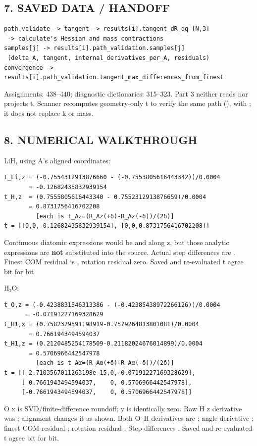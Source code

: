 \documentclass[10pt,a4paper]{article}
\begin{document}
\subsection{7. SAVED DATA / HANDOFF}
\begin{Verbatim}
path.validate -> tangent -> results[i].tangent_dR_dq [N,3]
 -> calculate's Hessian and mass contractions
samples[j] -> results[i].path_validation.samples[j]
 (delta_A, tangent, internal_derivatives_per_A, residuals)
convergence -> results[i].path_validation.tangent_max_differences_from_finest
\end{Verbatim}
Assignments: 438–440; diagnostic dictionaries: 315–323. Part 3 neither reads nor projects t. Scanner  recomputes geometry-only t to verify the same path (), with ; it does not replace k or mass.

\subsection{8. NUMERICAL WALKTHROUGH}
LiH, using A's aligned coordinates:

\begin{Verbatim}
t_Li,z = (-0.7554312913876660 - (-0.7553805616443342))/0.0004
       = -0.12682435832939154
t_H,z  = (0.7555805616443340 - 0.7552312913876659)/0.0004
       = 0.8731756416702208
         [each is t_Az=(R_Az(+δ)-R_Az(-δ))/(2δ)]
t = [[0,0,-0.12682435832939154], [0,0,0.8731756416702208]]
\end{Verbatim}
Continuous diatomic expressions would be  and  along z, but those analytic expressions are \textbf{not} substituted into the source. Actual step differences are \code{[4.440892098500626e-13,6.661338147750939e-13,0]}. Finest COM residual is , rotation residual zero. Saved and re-evaluated t agree bit for bit.

H₂O:

\begin{Verbatim}
t_O,z = (-0.4238831546313386 - (-0.42385438972266126))/0.0004
      = -0.07191227169328629
t_H1,x = (0.7582329591198919-0.7579264813801081)/0.0004
       = 0.7661943494594037
t_H1,z = (0.2120485254178509-0.21182024676014899)/0.0004
       = 0.5706966442547978
         [each is t_Aα=(R_Aα(+δ)-R_Aα(-δ))/(2δ)]
t = [[-2.7103567011263198e-15,0,-0.07191227169328629],
     [ 0.7661943494594037,    0, 0.5706966442547978],
     [-0.7661943494594037,    0, 0.5706966442547978]]
\end{Verbatim}
O x is SVD/finite-difference roundoff; y is identically zero. Raw H z derivative was ; alignment changes it as shown. Both O–H derivatives are ; angle derivative ; finest COM residual ; rotation residual . Step differences \code{[3.3306690738754696e-13,1.6653345369377348e-13,0]}. Saved and re-evaluated t agree bit for bit.
\end{document}
